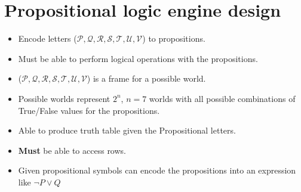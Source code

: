 \section*{Propositional logic engine design}

\begin{itemize}
	\item Encode letters ($\mathcal{P, Q, R, S, T, U, V}$) to propositions.
	\item Must be able to perform logical operations with the propositions.
	\item ($\mathcal{P, Q, R, S, T, U, V}$) is a frame for a possible world.
	\item Possible worlds represent $2^n$, $n=7$ worlds with all possible combinations of True/False values for the propositions.
	\item Able to produce truth table given the Propositional letters.
	\item \textbf{Must} be able to access rows.
	\item Given propositional symbols can encode the propositions into an expression like $\neg P \vee Q$
\end{itemize}






